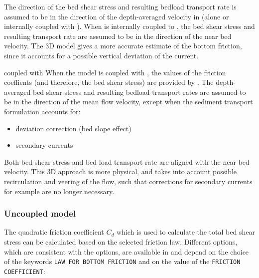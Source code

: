 The direction of the bed shear stress and resulting bedload transport rate is
assumed to be in the direction of the depth-averaged velocity in \sisyphe
(alone or internally coupled with \teldd). When \sisyphe is internally
coupled to \telddd, the bed shear stress and resulting transport rate are
assumed to be in the direction of the near bed velocity. The 3D model gives
a more accurate estimate of the bottom friction, since it accounts for a
possible vertical deviation of the current.

\begin{bclogo}[couleur = blue!10, arrondi = 0.10, logo = \bcattention]{\textsf{\sisyphe coupled with \teldd}}
When the model is coupled with \teldd, the values of the friction coeffients (and therefore, 
the bed shear stress) are provided by \teldd. The depth-averaged bed shear stress and resulting bedload transport rates are assumed to be in the direction of the mean flow velocity, except when the sediment transport
formulation accounts for:
\begin{itemize}
\item deviation correction (bed slope effect)
\item secondary currents 
\end{itemize} 
\end{bclogo}

Both bed shear stress and bed load transport rate are aligned with the near
bed velocity. This 3D approach is more physical, and takes into account
possible recirculation and veering of the flow, such that corrections for
secondary currents for example are no longer necessary.

\subsubsection{Uncoupled model}
The quadratic friction coefficient $C_d$ which is used to calculate the
total bed shear stress can be calculated based on the selected
friction law. Different options, which are consistent with the \teldd
options, are available in \sisyphe and depend on the choice of the keywords \texttt{LAW FOR
BOTTOM FRICTION} and on the value of the \texttt{FRICTION COEFFICIENT}:

